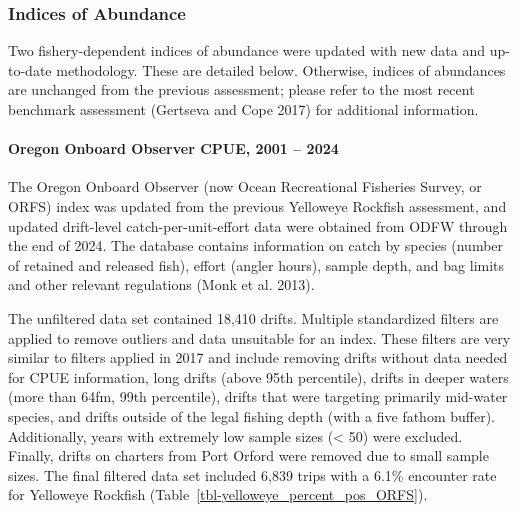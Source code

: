 \documentclass[
]{scrartcl}
\let\oldparagraph\paragraph
\renewcommand{\paragraph}[1]{\oldparagraph{#1}\mbox{}}
\begin{document}
\subsubsection{Indices of Abundance}\label{indices-of-abundance}

Two fishery-dependent indices of abundance were updated with new data
and up-to-date methodology. These are detailed below. Otherwise, indices
of abundances are unchanged from the previous assessment; please refer
to the most recent benchmark assessment (Gertseva and Cope 2017) for
additional information.

\paragraph{Oregon Onboard Observer CPUE, 2001 --
2024}\label{oregon-onboard-observer-cpue-2001-2024}

The Oregon Onboard Observer (now Ocean Recreational Fisheries Survey, or
ORFS) index was updated from the previous Yelloweye Rockfish assessment,
and updated drift-level catch-per-unit-effort data were obtained from
ODFW through the end of 2024. The database contains information on catch
by species (number of retained and released fish), effort (angler
hours), sample depth, and bag limits and other relevant regulations
(Monk et al. 2013).

The unfiltered data set contained 18,410 drifts. Multiple standardized
filters are applied to remove outliers and data unsuitable for an index.
These filters are very similar to filters applied in 2017 and include
removing drifts without data needed for CPUE information, long drifts
(above 95th percentile), drifts in deeper waters (more than 64fm, 99th
percentile), drifts that were targeting primarily mid-water species, and
drifts outside of the legal fishing depth (with a five fathom buffer).
Additionally, years with extremely low sample sizes (\textless{} 50)
were excluded. Finally, drifts on charters from Port Orford were removed
due to small sample sizes. The final filtered data set included 6,839
trips with a 6.1\% encounter rate for Yelloweye Rockfish
(Table~\ref{tbl-yelloweye_percent_pos_ORFS}).
\end{document}
